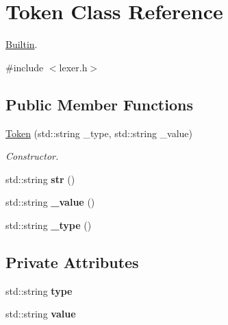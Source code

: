 \hypertarget{classToken}{}\section{Token Class Reference}
\label{classToken}


\hyperlink{classBuiltin}{Builtin}.  




{\ttfamily \#include $<$lexer.\+h$>$}

\subsection*{Public Member Functions}
\begin{DoxyCompactItemize}
\item 
\hyperlink{classToken_aaf5d395b7e719261b22084ccd3a4a817}{Token} (std\+::string \+\_\+type, std\+::string \+\_\+value)
\begin{DoxyCompactList}\small\item\em Constructor. \end{DoxyCompactList}\item 
std\+::string {\bfseries str} ()\hypertarget{classToken_a33bfec5b17b73782b82ef3fbd4457f34}{}\label{classToken_a33bfec5b17b73782b82ef3fbd4457f34}

\item 
std\+::string {\bfseries \+\_\+value} ()\hypertarget{classToken_abe8caac0c2c36c946de807fa2516747a}{}\label{classToken_abe8caac0c2c36c946de807fa2516747a}

\item 
std\+::string {\bfseries \+\_\+type} ()\hypertarget{classToken_a2d2621cdc660d2e899a119772c6e5dea}{}\label{classToken_a2d2621cdc660d2e899a119772c6e5dea}

\end{DoxyCompactItemize}
\subsection*{Private Attributes}
\begin{DoxyCompactItemize}
\item 
std\+::string {\bfseries type}\hypertarget{classToken_aefd47409d3aa046b78eac3210aab75fe}{}\label{classToken_aefd47409d3aa046b78eac3210aab75fe}

\item 
std\+::string {\bfseries value}\hypertarget{classToken_a4b7142147b8598f8e24c404928d9263b}{}\label{classToken_a4b7142147b8598f8e24c404928d9263b}

\end{DoxyCompactItemize}


